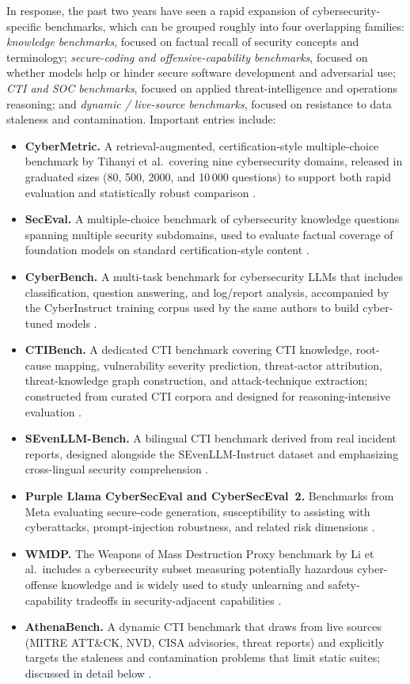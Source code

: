 \documentclass[unnumsec,webpdf,contemporary,large]{oup-authoring-template}
\theoremstyle{thmstyleone}
\theoremstyle{thmstyletwo}
\theoremstyle{thmstylethree}
\begin{document}
In response, the past two years have seen a rapid expansion of cybersecurity-specific benchmarks, which can be grouped roughly into four overlapping families: \emph{knowledge benchmarks}, focused on factual recall of security concepts and terminology; \emph{secure-coding and offensive-capability benchmarks}, focused on whether models help or hinder secure software development and adversarial use; \emph{CTI and SOC benchmarks}, focused on applied threat-intelligence and operations reasoning; and \emph{dynamic / live-source benchmarks}, focused on resistance to data staleness and contamination. Important entries include:

\begin{itemize}
  \item \textbf{CyberMetric.} A retrieval-augmented, certification-style multiple-choice benchmark by Tihanyi et al.\ covering nine cybersecurity domains, released in graduated sizes (80, 500, 2000, and 10\,000 questions) to support both rapid evaluation and statistically robust comparison \cite{tihanyi2024cybermetric}.
  \item \textbf{SecEval.} A multiple-choice benchmark of cybersecurity knowledge questions spanning multiple security subdomains, used to evaluate factual coverage of foundation models on standard certification-style content \cite{hu2024seceval}.
  \item \textbf{CyberBench.} A multi-task benchmark for cybersecurity LLMs that includes classification, question answering, and log/report analysis, accompanied by the CyberInstruct training corpus used by the same authors to build cyber-tuned models \cite{liu2024cyberbench}.
  \item \textbf{CTIBench.} A dedicated CTI benchmark covering CTI knowledge, root-cause mapping, vulnerability severity prediction, threat-actor attribution, threat-knowledge graph construction, and attack-technique extraction; constructed from curated CTI corpora and designed for reasoning-intensive evaluation \cite{alam2024ctibench}.
  \item \textbf{SEvenLLM-Bench.} A bilingual CTI benchmark derived from real incident reports, designed alongside the SEvenLLM-Instruct dataset and emphasizing cross-lingual security comprehension \cite{ji2024sevenllm}.
  \item \textbf{Purple Llama CyberSecEval and CyberSecEval~2.} Benchmarks from Meta evaluating secure-code generation, susceptibility to assisting with cyberattacks, prompt-injection robustness, and related risk dimensions \cite{bhatt2023purplellama,bhatt2024cyberseceval2}.
  \item \textbf{WMDP.} The Weapons of Mass Destruction Proxy benchmark by Li et al.\ includes a cybersecurity subset measuring potentially hazardous cyber-offense knowledge and is widely used to study unlearning and safety-capability tradeoffs in security-adjacent capabilities \cite{li2024wmdp}.
  \item \textbf{AthenaBench.} A dynamic CTI benchmark that draws from live sources (MITRE ATT\&CK, NVD, CISA advisories, threat reports) and explicitly targets the staleness and contamination problems that limit static suites; discussed in detail below \cite{alam2025athenabench}.
\end{itemize}
\end{document}
